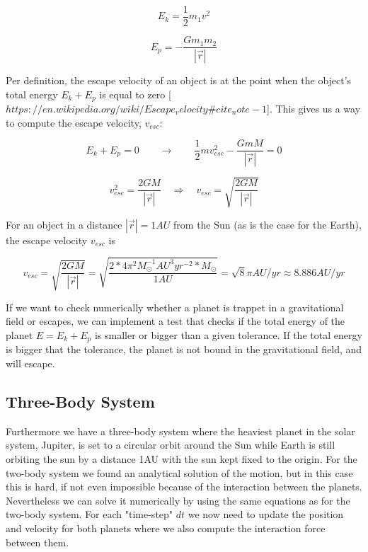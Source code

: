 \documentclass[norsk,a4paper,12pt]{article}
\begin{document}
\begin{equation}
    E_k = \frac{1}{2} m_1 v^2
    \label{eq:kineticE}
\end{equation}

\begin{equation}
    E_p = - \frac{G m_1 m_2}{|\vec{r}|}
    \label{eq:potE}
\end{equation}
\par 
\vspace{3mm}

Per definition, the escape velocity of an object is at the point when the object's total energy $E_k + E_p$ is equal to zero [ $https://en.wikipedia.org/wiki/Escape_velocity\#cite_note-1$]. This gives us a way to compute the escape velocity, $v_{esc}$:

\begin{equation*}
    E_k + E_p = 0 \qquad \rightarrow \qquad \frac{1}{2} m v_{esc}^2 - \frac{G m M}{|\vec{r}|} = 0
\end{equation*}

\begin{equation}
     v_{esc}^2 = \frac{2 G M}{|\vec{r}|} \quad \Rightarrow \quad v_{esc} = \sqrt{\frac{2 G M}{|\vec{r}|}}
     \label{esc_v}
\end{equation}

For an object in a distance $|\vec{r}| = 1AU$ from the Sun (as is the case for the Earth), the escape velocity $v_{esc}$ is 

\begin{equation*}
    v_{esc} = \sqrt{\frac{2 G M}{|\vec{r}|}} = \sqrt{\frac{2 * 4\pi^2 M_{\odot} ^{-1} AU^3 yr^{-2} * M_{\odot}}{1 AU}} = \sqrt{8}\pi AU/yr \approx 8.886 AU/yr
\end{equation*}

If we want to check numerically whether a planet is trappet in a gravitational field or escapes, we can implement a test that checks if the total energy of the planet $E = E_k + E_p$ is smaller or bigger than a given tolerance. If the total energy is bigger that the tolerance, the planet is not bound in the gravitational field, and will escape.


\subsection{Three-Body System}
Furthermore we have a three-body system where the heaviest planet in the solar system, Jupiter, is set to a circular orbit around the Sun while Earth is still orbiting the sun by a distance 1AU with the sun kept fixed to the origin. For the two-body system we found an analytical solution of the motion, but in this case this is hard, if not even impossible because of the interaction between the planets. Nevertheless we can solve it numerically by using the same equations as for the two-body system. For each "time-step" $dt$ we now need to update the position and velocity for both planets where we also compute the interaction force between them. 
\end{document}
